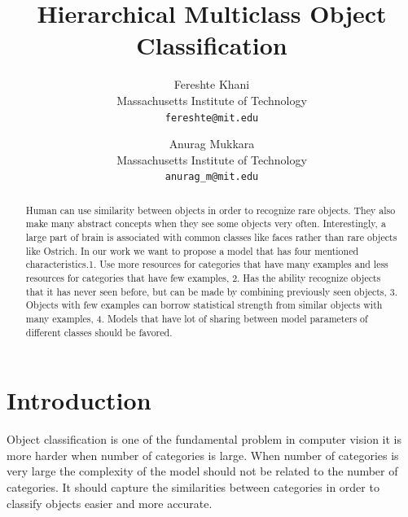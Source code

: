 \documentclass[10pt,twocolumn,letterpaper]{article}
\begin{document}
\title{Hierarchical Multiclass Object Classification }

\author{Fereshte Khani\\ 
Massachusetts Institute of Technology\\
{\tt\small fereshte@mit.edu}
\and
Anurag Mukkara\\
Massachusetts Institute of Technology\\
{\tt\small anurag\_m@mit.edu}
}



\maketitle

\begin{abstract}
	
	Human can use similarity between objects in order to recognize rare objects. They also make many abstract concepts when they see some objects very often. Interestingly, a large part of brain is associated with common classes like faces rather than rare objects like Ostrich.
	In our work we want to propose a model that has four mentioned characteristics.1. Use more resources for categories that have many examples and less resources for categories that have few examples, 2. Has the ability recognize objects that it has never seen before, but can be made by combining previously seen objects, 3. Objects with few examples can borrow statistical strength from similar objects with many examples, 4. Models that have lot of sharing between model parameters of different classes should be favored.
	
\end{abstract}

\section{Introduction}

Object classification is one of the fundamental problem in computer vision it is more harder when number of categories is large. When number of categories is very large the complexity of the model should not be related to the number of categories. It should capture the similarities between categories in order to classify objects easier and more accurate.
\end{document}
